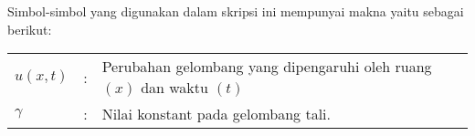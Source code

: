 \begin{Daftarsimbol}

Simbol-simbol yang digunakan dalam skripsi ini mempunyai makna yaitu sebagai berikut:

\begin{tabular}{lll}
$u(x,t)$ &: &Perubahan gelombang yang dipengaruhi oleh ruang $(x)$ dan waktu $(t)$\\
$\gamma$ &: &Nilai konstant pada gelombang tali.
\end{tabular}
\end{Daftarsimbol}
